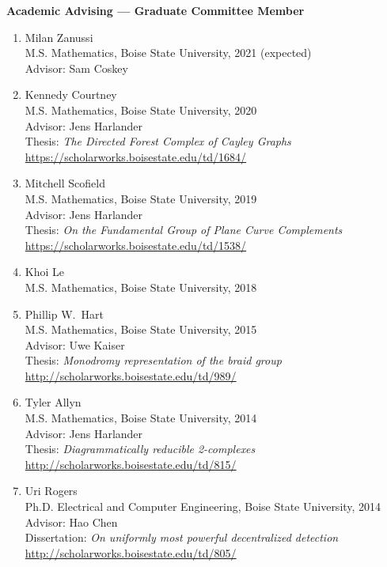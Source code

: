 \documentclass[12pt]{article}
\begin{document}
\textbf{Academic Advising --- Graduate Committee Member}
\begin{enumerate}[revarabic,labelwidth=*]

\item Milan Zanussi \\
M.S. Mathematics, Boise State University, 2021 (expected) \\
Advisor: Sam Coskey

\item Kennedy Courtney \\
M.S. Mathematics, Boise State University, 2020 \\
Advisor: Jens Harlander \\
Thesis: \emph{The Directed Forest Complex of Cayley Graphs} \\
\url{https://scholarworks.boisestate.edu/td/1684/}

\item Mitchell Scofield \\
M.S. Mathematics, Boise State University, 2019 \\
Advisor: Jens Harlander \\
Thesis: \emph{On the Fundamental Group of Plane Curve Complements} \\
\url{https://scholarworks.boisestate.edu/td/1538/}

\item Khoi Le \\
M.S. Mathematics, Boise State University, 2018 \\

\item Phillip W.\ Hart \\
M.S. Mathematics, Boise State University, 2015 \\
Advisor: Uwe Kaiser \\
Thesis: \emph{Monodromy representation of the braid group} \\
\url{http://scholarworks.boisestate.edu/td/989/}

\item Tyler Allyn \\
M.S. Mathematics, Boise State University, 2014 \\
Advisor: Jens Harlander \\
Thesis: \emph{Diagrammatically reducible 2-complexes} \\
\url{http://scholarworks.boisestate.edu/td/815/}

\item Uri Rogers \\
Ph.D. Electrical and Computer Engineering, Boise State University, 2014 \\
Advisor: Hao Chen \\
Dissertation: \emph{On uniformly most powerful decentralized detection} \\
\url{http://scholarworks.boisestate.edu/td/805/}


\end{enumerate}
\end{document}
